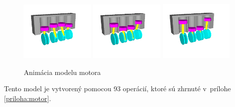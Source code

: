 \begin{figure}[H]
	\includegraphics[trim=40 40 80 40,clip,width=0.32\textwidth]{obrazky-figures/Examples/engine/engine t=7.png}
	\includegraphics[trim=40 40 80 40,clip,width=0.32\textwidth]{obrazky-figures/Examples/engine/engine t=8.png}
	\includegraphics[trim=40 40 80 40,clip,width=0.32\textwidth]{obrazky-figures/Examples/engine/engine t=9.png}
	\caption{Animácia modelu motora}
	\label{fig:motorAnimation}
\end{figure}
Tento model je vytvorený pomocou 93 operácií, ktoré sú zhrnuté v~prílohe \ref{priloha:motor}.



